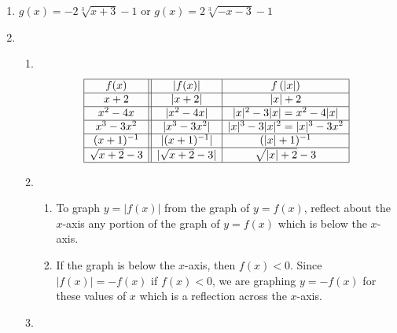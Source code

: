 \begin{enumerate}
\setcounter{enumi}{\value{HW}}



\item $g(x) = -2\sqrt[3]{x + 3} - 1$ or $g(x) = 2\sqrt[3]{-x - 3} - 1$

\addtocounter{enumi}{4}

\item  \begin{enumerate}

\item  $~$


 
\[ \begin{array}{|c||c|c|}

\hline

f(x) & |f(x)| & f\left(|x| \right)  \\ \hline

x+2 &     |x+2|   &       |x|+2      \\ \hline

x^2-4x &    |x^2-4x|      &     |x|^2-3|x| = x^2-4|x|      \\  \hline

x^3-3x^2 &    |x^3-3x^2|     &  |x|^3-3|x|^2 = |x|^3-3x^2      \\  \hline  

(x+1)^{-1}  &     |(x+1)^{-1}|      &    (|x|+1)^{-1}       \\  \hline   

\sqrt{x+2}-3&    | \sqrt{x+2}-3 |       &    \sqrt{|x|+2}-3    \\  \hline   

 \end{array} \]



\item  \begin{enumerate}

\item To graph $y=|f(x)|$ from the graph of  $y=f(x)$, reflect about the $x$-axis any portion of the graph of $y=f(x)$ which is below the $x$-axis.

\item  If the graph is below the $x$-axis, then $f(x) < 0$.  Since $|f(x)| = -f(x)$ if $f(x) < 0$, we are graphing $y=-f(x)$ for these values of $x$ which is a reflection across the $x$-axis.

\end{enumerate}

\item   \begin{enumerate}


\end{enumerate}
\end{enumerate}
\end{enumerate}
